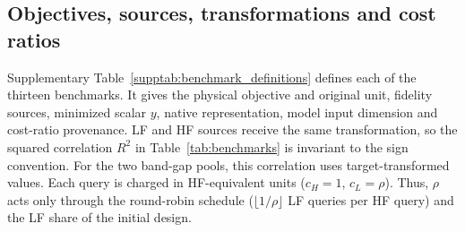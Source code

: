 
\subsection{Objectives, sources, transformations and cost ratios}
Supplementary Table~\ref{supptab:benchmark_definitions} defines each of the thirteen benchmarks. It gives the physical objective and original unit, fidelity sources, minimized scalar $y$, native representation, model input dimension and cost-ratio provenance. LF and HF sources receive the same transformation, so the squared correlation $R^2$ in Table~\ref{tab:benchmarks} is invariant to the sign convention. For the two band-gap pools, this correlation uses target-transformed values. Each query is charged in HF-equivalent units ($c_H = 1$, $c_L = \rho$). Thus, $\rho$ acts only through the round-robin schedule ($\lfloor 1/\rho \rfloor$ LF queries per HF query) and the LF share of the initial design.

